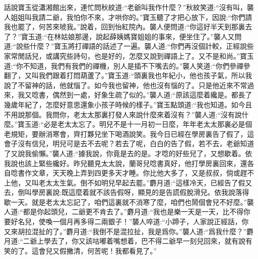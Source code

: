 


\begin{parag}
    話說寶玉從瀟湘館出來，連忙問秋紋道:“老爺叫我作什麼？”秋紋笑道:“沒有叫，襲人姐姐叫我請二爺，我怕你不來，才哄你的。”寶玉聽了才把心放下，因說:“你們請我也罷了，何苦來唬我。”說着，回到怡紅院內。襲人便問道:“你這好半天到那裏去了？”寶玉道:“在林姑娘那邊，說起薛姨媽寶姐姐的事來，便坐住了。”襲人又問道:“說些什麼？”寶玉將打禪語的話述了一遍。襲人道:“你們再沒個計較，正經說些家常閒話兒，或講究些詩句，也是好的，怎麼又說到禪語上了。又不是和尚。”寶玉道:“你不知道，我們有我們的禪機，別人是插不下嘴去的。”襲人笑道:“你們參禪參翻了，又叫我們跟着打悶葫蘆了。”寶玉道:“頭裏我也年紀小，他也孩子氣，所以我說了不留神的話，他就惱了。如今我也留神，他也沒有惱的了。只是他近來不常過來，我又唸書，偶然到一處，好象生疏了似的。”襲人道:“原該這麼着纔是。都長了幾歲年紀了，怎麼好意思還象小孩子時候的樣子。”寶玉點頭道:“我也知道。如今且不用說那個。我問你，老太太那裏打發人來說什麼來着沒有？”襲人道:“沒有說什麼。”寶玉道:“必是老太太忘了。明兒不是十一月初一日麼，年年老太太那裏必是個老規矩，要辦消寒會，齊打夥兒坐下喝酒說笑。我今日已經在學房裏告了假了，這會子沒有信兒，明兒可是去不去呢？若去了呢，白白的告了假，若不去，老爺知道了又說我偷懶。”襲人道:“據我說，你竟是去的是。才唸的好些兒了，又想歇着。依我說也該上緊些纔好。昨兒聽見太太說，蘭哥兒唸書真好，他打學房裏回來，還各自唸書作文章，天天晚上弄到四更多天才睡。你比他大多了，又是叔叔，倘或趕不上他，又叫老太太生氣。倒不如明兒早起去罷。”麝月道:“這樣冷天，已經告了假又去，倒叫學房裏說:既這麼着就不該告假呀，顯見的是告謊假脫滑兒。依我說落得歇一天。就是老太太忘記了，咱們這裏就不消寒了麼，咱們也鬧個會兒不好麼。”襲人道:“都是你起頭兒，二爺更不肯去了。”麝月道:“我也是樂一天是一天，比不得你要好名兒，使喚一個月再多得二兩銀子！”襲人啐道:“小蹄子，人家說正經話，你又來胡拉混扯的了。”麝月道:“我倒不是混拉扯，我是爲你。”襲人道:“爲我什麼？”麝月道:“二爺上學去了，你又該咕嘟着嘴想着，巴不得二爺早一刻兒回來，就有說有笑的了。這會兒又假撇清，何苦呢！我都看見了。”
\end{parag}


